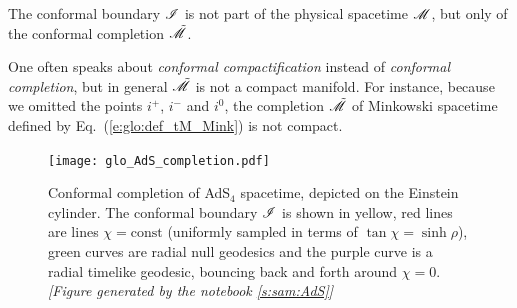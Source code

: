\begin{remark}
The conformal boundary $\mathscr{I}$ is not part of the physical spacetime
$\mathscr{M}$, but only of the conformal completion $\tilde{\mathscr{M}}$.
\end{remark}

\begin{remark}
One often speaks about
\emph{conformal compactification}
instead of \emph{conformal completion}, but in general $\tilde{\mathscr{M}}$ is not a
compact manifold. For instance, because we omitted the points $i^+$, $i^-$ and $i^0$,
the completion $\tilde{\mathscr{M}}$ of Minkowski spacetime defined by Eq.~(\ref{e:glo:def_tM_Mink})
is not compact.
\end{remark}

\begin{figure}
\centerline{\texttt{[image: glo\_AdS\_completion.pdf]}}
\caption[]{\label{f:glo:AdS_completion} \footnotesize
Conformal completion of AdS$_{4}$ spacetime, depicted on the Einstein cylinder.
The conformal boundary $\mathscr{I}$ is shown in yellow, red lines are lines
$\chi=\mathrm{const}$ (uniformly sampled in terms of $\tan\chi = \sinh\rho$),
green curves are radial null geodesics and the purple curve
is a radial timelike geodesic, bouncing back and forth around $\chi=0$.
\textsl{[Figure generated by the notebook \ref{s:sam:AdS}]}
}
\end{figure}

